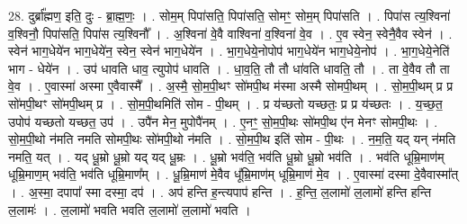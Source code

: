 \documentclass[17pt]{extarticle}
\begin{document}
28. दुर्ब्रा᳚ह्मण॒ इति॒ दुः - ब्रा॒ह्म॒णः॒ । . सोम॒म् पिपा॑सति॒ पिपा॑सति॒ सोमꣳ॒॒ सोम॒म् पिपा॑सति । . पिपा॑स त्य॒श्विना॑ व॒श्विनौ॒ पिपा॑सति॒ पिपा॑स त्य॒श्विनौ᳚ । . अ॒श्विना॑ वे॒वै वाश्विना॑ व॒श्विना॑ वे॒व । . ए॒व स्वेन॒ स्वेनै॒वैव स्वेन॑ । . स्वेन॑ भाग॒धेये॑न भाग॒धेये॑न॒ स्वेन॒ स्वेन॑ भाग॒धेये॑न । . भा॒ग॒धेये॒नोपोप॑ भाग॒धेये॑न भाग॒धेये॒नोप॑ । . भा॒ग॒धेये॒नेति॑ भाग - धेये॑न । . उप॑ धावति धाव॒ त्युपोप॑ धावति । . धा॒व॒ति॒ तौ तौ धा॑वति धावति॒ तौ । . ता वे॒वैव तौ ता वे॒व । . ए॒वास्मा॑ अस्मा ए॒वैवास्मै᳚ । . अ॒स्मै॒ सो॒म॒पी॒थꣳ सो॑मपी॒थ म॑स्मा अस्मै सोमपी॒थम् । . सो॒म॒पी॒थम् प्र प्र सो॑मपी॒थꣳ सो॑मपी॒थम् प्र । . सो॒म॒पी॒थमिति॑ सोम - पी॒थम् । . प्र य॑च्छतो यच्छतः॒ प्र प्र य॑च्छतः । . य॒च्छ॒त॒ उपोप॑ यच्छतो यच्छत॒ उप॑ । . उपै॑न मेन॒ मुपोपै॑नम् । . ए॒नꣳ॒॒ सो॒म॒पी॒थः सो॑मपी॒थ ए॑न मेनꣳ सोमपी॒थः । . सो॒म॒पी॒थो न॑मति नमति सोमपी॒थः सो॑मपी॒थो न॑मति । . सो॒म॒पी॒थ इति॑ सोम - पी॒थः । . न॒म॒ति॒ यद् यन् न॑मति नमति॒ यत् । . यद् धू॒म्रो धू॒म्रो यद् यद् धू॒म्रः । . धू॒म्रो भव॑ति॒ भव॑ति धू॒म्रो धू॒म्रो भव॑ति । . भव॑ति धूम्रि॒माण॑म् धूम्रि॒माण॒म् भव॑ति॒ भव॑ति धूम्रि॒माण᳚म् । . धू॒म्रि॒माण॑ मे॒वैव धू᳚म्रि॒माण॑म् धूम्रि॒माण॑ मे॒व । . ए॒वास्मा॑ दस्मा दे॒वैवास्मा᳚त् । . अ॒स्मा॒ दपापा᳚ स्मा दस्मा॒ दप॑ । . अप॑ हन्ति ह॒न्त्यपाप॑ हन्ति । . ह॒न्ति॒ ल॒लामो॑ ल॒लामो॑ हन्ति हन्ति ल॒लामः॑ । . ल॒लामो॑ भवति भवति ल॒लामो॑ ल॒लामो॑ भवति । \newline
\end{document}
